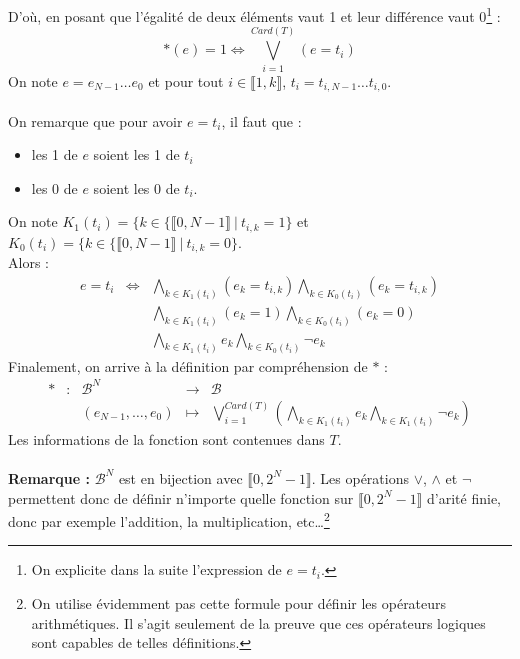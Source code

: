 \documentclass[../main.tex]{subfiles}
\begin{document}
\\ \\
D'où, en posant que l'égalité de deux éléments vaut 1 et leur différence vaut 0\footnote{On explicite dans la suite l'expression de $e = t_{i}$.} :
\begin{equation}
	\ast(e) = 1 \Leftrightarrow \displaystyle\bigvee_{i = 1}^{Card(T)}(e = t_i)
\end{equation}
On note $e = e_{N-1}\dots e_{0}$ et pour tout $i\in{\llbracket 1, k\rrbracket}$, $t_{i} = t_{i, N-1}\dots t_{i, 0}$.
\\ \\
On remarque que pour avoir $e = t_{i}$, il faut que :
\begin{itemize}
	\item les 1 de $e$ soient les 1 de $t_{i}$
	\item les 0 de $e$ soient les 0 de $t_{i}$.
\end{itemize}
On note $K_{1}(t_{i}) = \{k\in\{\llbracket 0, N-1\rrbracket\ |\ t_{i, k} = 1\}$ et $K_{0}(t_{i}) = \{k\in\{\llbracket 0, N-1\rrbracket\ |\ t_{i, k} = 0\}$. \\
Alors :
$$
\begin{array}{lcl}
	e = t_i & \Leftrightarrow & \displaystyle\bigwedge_{k\in{K_{1}(t_i)}}(e_k = t_{i, k})\displaystyle\bigwedge_{k\in{K_{0}(t_i)}}(e_k = t_{i, k}) \\
 & & \displaystyle\bigwedge_{k\in{K_{1}(t_i)}}(e_k = 1)\displaystyle\bigwedge_{k\in{K_{0}(t_i)}}(e_k = 0) \\
 & & \displaystyle\bigwedge_{k\in{K_{1}(t_i)}}e_k\displaystyle\bigwedge_{k\in{K_{0}(t_i)}}\neg{e_k}
\end{array}
$$
Finalement, on arrive à la définition par compréhension de $\ast$ :
\begin{displaymath}
\begin{array}{lclcl}
\ast & : & \mathcal{B}^{N} & \rightarrow & \mathcal{B} \\
& & (e_{N-1}, \dots, e_{0}) & \mapsto & \displaystyle\bigvee_{i = 1}^{Card(T)}\left(\displaystyle\bigwedge_{k\in{K_{1}(t_i)}}e_k\displaystyle\bigwedge_{k\in{K_{1}(t_i)}}\neg{e_k}\right)
\end{array}
\end{displaymath}
Les informations de la fonction sont contenues dans $T$.
\\ \\
\textbf{Remarque : }$\mathcal{B}^{N}$ est en bijection avec $\llbracket 0, 2^{N}-1\rrbracket$. Les opérations $\vee$, $\wedge$ et $\neg$ permettent donc de définir n'importe quelle fonction sur $\llbracket 0, 2^{N}-1\rrbracket$ d'arité finie, donc par exemple l'addition, la multiplication, etc\dots\footnote{On utilise évidemment pas cette formule pour définir les opérateurs arithmétiques. Il s'agit seulement de la preuve que ces opérateurs logiques sont capables de telles définitions.}
\end{document}
